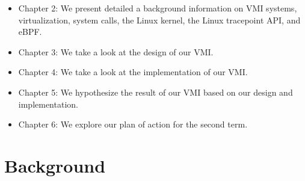 \documentclass{report}
\begin{document}
\begin{spacing}{1.5}
{\begin{itemize}
  \item Chapter 2: We present detailed a background information on VMI systems, virtualization, system calls, the Linux kernel, the Linux tracepoint API, and eBPF.
  \item Chapter 3: We take a look at the design of our VMI.
  \item Chapter 4: We take a look at the implementation of our VMI.
  \item Chapter 5: We hypothesize the result of our VMI based on our design and implementation.
  \item Chapter 6: We explore our plan of action for the second term.
  \newline
\end{itemize}
}












































































\chapter{Background}


\end{spacing}
\end{document}
